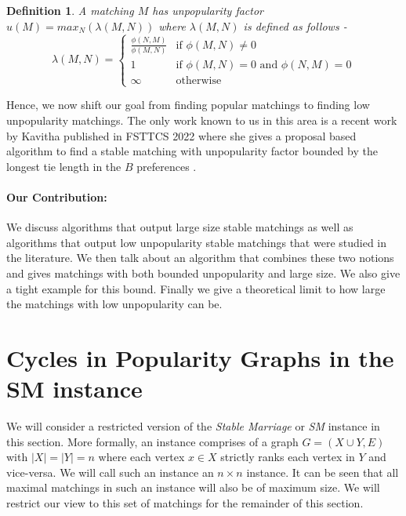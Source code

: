 \documentclass[a4paper,10pt]{article}
\theoremstyle{plain} %
\theoremstyle{plain} %
\newtheorem{definition}{Definition}[section] %
\begin{document}
\begin{definition}
    A matching $M$ has unpopularity factor $u(M) = max_N(\lambda(M, N))$ where $\lambda(M, N)$ is defined as follows - 
    \begin{equation}
        \lambda(M, N) =
        \begin{cases}
            \frac{\phi(N, M)}{\phi(M, N)} & \text{if $\phi(M, N) \neq 0$} \\
            1 & \text{if $\phi(M, N) = 0$ and $\phi(N, M) = 0$} \\
            \infty & \text{otherwise}
        \end{cases}
    \end{equation}
\end{definition}

Hence, we now shift our goal from finding popular matchings to finding low unpopularity matchings. The only work known to us in this area is a recent work by Kavitha published in FSTTCS 2022 where she gives a proposal based algorithm to find a stable matching with unpopularity factor bounded by the longest tie length in the $B$ preferences \cite{kavitha2022stable}.

\paragraph{Our Contribution:}
We discuss algorithms that output large size stable matchings as well as algorithms that output low unpopularity stable matchings that were studied in the literature. We then talk about an algorithm that combines these two notions and gives matchings with both bounded unpopularity and large size. We also give a tight example for this bound. Finally we give a theoretical limit to how large the matchings with low unpopularity can be.

\section{Cycles in Popularity Graphs in the SM instance}
We will consider a restricted version of the \textit{Stable Marriage} or \textit{SM} instance in this section. More formally, an instance comprises of a graph $G = (X \cup Y, E)$ with $|X| = |Y| = n$ where each vertex $x \in X$ strictly ranks each vertex in $Y$ and vice-versa. We will call such an instance an $n \times n$ instance. It can be seen that all maximal matchings in such an instance will also be of maximum size. We will restrict our view to this set of matchings for the remainder of this section. 
\end{document}
